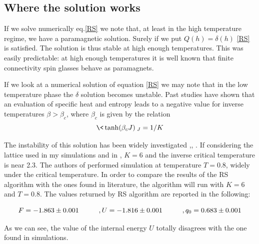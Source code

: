 \subsection{Where the solution works}

If we solve numerically eq.\ref{RS} we note that, at least in the high temperature regime, we  have a paramagnetic solution. Surely if we put $Q(h) = \delta(h)$  \ref{RS} is satisfied. The solution is thus stable at high enough temperatures.
This was easily predictable: at high enough temperatures it is well known that finite connectivity spin glasses behave as paramagnets.

If we look at a numerical solution of equation \ref{RS} we may note that in the low temperature phase the $\delta$ solution becomes unstable. Past studies have shown that an evaluation of specific heat and entropy leads to a negative value for inverse temperatures $\beta>\beta_c$, where $\beta_c$ is given by the relation
\begin{equation}
\< \tanh( \beta_c J )\>_J = 1/K
\end{equation}



The instability of this solution has been widely investigated \cite{instability},\cite{thou},  \cite{tersenghi}. If considering the lattice used in my simulations and in \cite{zullo}, $K = 6$ and the inverse critical temperature is near 2.3.
The authors of \cite{zullo} performed simulation at temperature $T=0.8$, widely under the critical temperature.
In order to compare the results of the RS algorithm with the ones found in literature, the algorithm will run with $K=6$ and $T=0.8$.
The values returned by RS algorithm are reported in the following:

\begin{equation}
F = -1.863 \pm 0.001 \hspace{1 cm},U = -1.816 \pm 0.001 \hspace{1 cm}, q_0 = 0.683 \pm 0.001
\end{equation}

As we can see, the value of the internal energy $U$ totally disagrees with the one found in simulations.


